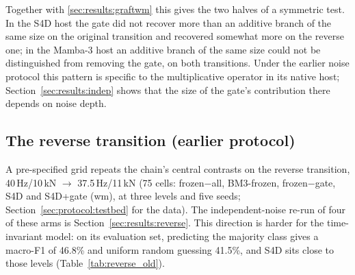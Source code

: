 Together with \ref{sec:results:graftwm} this gives the two halves of a symmetric test. In the S4D host the gate did not recover more than an additive branch of the same size on the original transition and recovered somewhat more on the reverse one; in the Mamba-3 host an additive branch of the same size could not be distinguished from removing the gate, on both transitions. Under the earlier noise protocol this pattern is specific to the multiplicative operator in its native host; Section~\ref{sec:results:indep} shows that the size of the gate's contribution there depends on noise depth.

\subsection{The reverse transition (earlier protocol)}
\label{sec:results:reverse_old}

A pre-specified grid repeats the chain's central contrasts on the reverse transition, 40\,Hz/10\,kN $\rightarrow$ 37.5\,Hz/11\,kN (75 cells: frozen$-$all, BM3-frozen, frozen$-$gate, S4D and S4D+gate (wm), at three levels and five seeds; Section~\ref{sec:protocol:testbed} for the data). The independent-noise re-run of four of these arms is Section~\ref{sec:results:reverse}. This direction is harder for the time-invariant model: on its evaluation set, predicting the majority class gives a macro-F1 of 46.8\% and uniform random guessing 41.5\%, and S4D sits close to those levels (Table~\ref{tab:reverse_old}).

